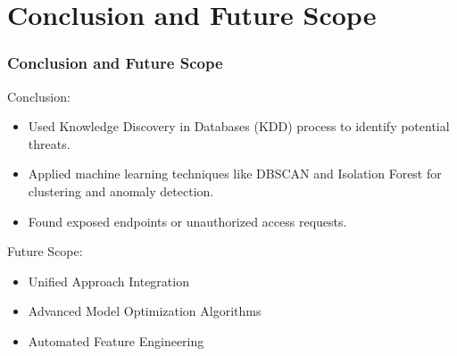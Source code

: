 \documentclass[10pt, a4paper]{beamer}
\begin{document}
	
	\section{Conclusion and Future Scope}
	\begin{frame}
		\frametitle{Conclusion and Future Scope}
		
		\begin{block}{Conclusion:}
			\begin{itemize}
				\item Used Knowledge Discovery in Databases (KDD) process to identify potential threats.
				\item Applied machine learning techniques like DBSCAN and Isolation Forest for clustering and anomaly detection.
				\item Found exposed endpoints or unauthorized access requests.
			\end{itemize}
		\end{block}
		
				\begin{block}{Future Scope:}
			\begin{itemize}
				\item Unified Approach Integration
				\item Advanced Model Optimization Algorithms
				\item Automated Feature Engineering				
			\end{itemize}
		\end{block}
	
	\end{frame}
	
	
	
	
	
	
	
\end{document}
